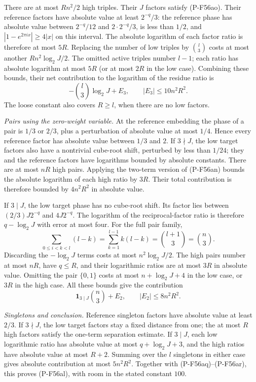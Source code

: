 \documentclass[11pt,a4paper]{article}
\begin{document}
There are at most $Rn^2/2$ high triples.
Their $J$ factors satisfy (P-F56ao). Their reference
factors have absolute value at least $2^{-q}/3$:
the reference phase has absolute value between
$2^{-q}/12$ and $2\cdot2^{-q}/3$, is less than $1/2$,
and $|1-e^{2\pi ix}|\ge4|x|$ on this interval.
The absolute logarithm of each factor ratio is therefore
at most $5R$. Replacing the number of low triples by
$\binom l3$ costs at most another $Rn^2\log_2 J/2$.
The omitted active triples number $l-1$; each ratio
has absolute logarithm at most $5R$ (or at most $2R$
in the low case). Combining these bounds, their net
contribution to the logarithm of the residue ratio is
\[
               -\binom l3\log_2 J+E_3,
                         \qquad |E_3|\le10n^2R^2.
 \tag{P-F56aq}
\]
The loose constant also covers $R\ge l$, when there
are no low factors.

\emph{Pairs using the zero-weight variable.}
At the reference embedding the phase of a pair is
$1/3$ or $2/3$, plus a perturbation of absolute value
at most $1/4$. Hence every reference factor has
absolute value between $1/3$ and $2$.
If $3\nmid J$, the low target factors also have a
nontrivial cube-root shift, perturbed by less than
$1/24$; they and the reference factors have logarithms
bounded by absolute constants.
There are at most $nR$ high pairs. Applying the
two-term version of (P-F56an) bounds the absolute
logarithm of each high ratio by $3R$.
Their total contribution is therefore bounded by
$4n^2R^2$ in absolute value.

If $3\mid J$, the low target phase has no cube-root
shift. Its factor lies between
$(2/3)J2^{-q}$ and $4J2^{-q}$.
The logarithm of the reciprocal-factor ratio is
therefore $q-\log_2 J$ with error at most four.
For the full pair family,
\[
 \sum_{0\le i<k<l}(l-k)
      =\sum_{k=1}^{l-1}k(l-k)
      =\binom{l+1}{3}=\binom n3.
\]
Discarding the $-\log_2 J$ terms costs at most
$n^2\log_2 J/2$. The high pairs number at most $nR$,
have $q\le R$, and their logarithmic ratios are at
most $3R$ in absolute value. Omitting the pair
$\{0,1\}$ costs at most $n+\log_2 J+4$ in the low
case, or $3R$ in the high case. All these bounds give
the contribution
\[
           \mathbf1_{3\mid J}\binom n3+E_2,
                         \qquad |E_2|\le8n^2R^2.
 \tag{P-F56ar}
\]

\emph{Singletons and conclusion.}
Reference singleton factors have absolute value at
least $2/3$. If $3\nmid J$, the low target factors
stay a fixed distance from one; the at most $R$
high factors satisfy the one-term separation estimate.
If $3\mid J$, each low logarithmic ratio has absolute
value at most $q+\log_2 J+3$, and the high ratios have
absolute value at most $R+2$.
Summing over the $l$ singletons in either case gives
absolute contribution at most $5n^2R^2$.
Together with (P-F56aq)--(P-F56ar), this proves
(P-F56al), with room in the stated constant $100$.
\end{document}
